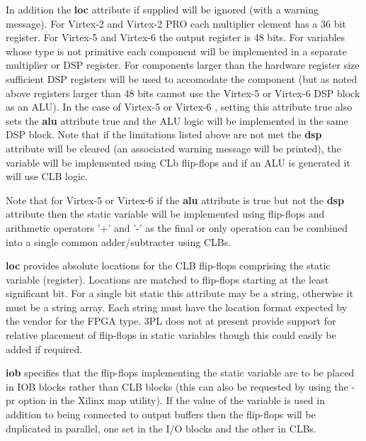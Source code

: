         In addition the {\bf loc} attribute if supplied will be ignored (with a
        warning message). For Virtex-2 and Virtex-2 PRO each multiplier element
        has a 36 bit register. For Virtex-5 and Virtex-6 the output register is
        48 bits. For variables whose type is not primitive each component will
        be implemented in a separate multiplier or DSP register. For components
        larger than the hardware register size sufficient DSP registers will be
        used to accomodate the component (but as noted above registers larger
        than 48 bits cannot use the Virtex-5 or Virtex-6 DSP block as an ALU).
        In the case of Virtex-5 or Virtex-6 , setting this attribute true also
        sets the {\bf alu} attribute true and the ALU logic will be implemented in the
        same DSP block. Note that if the limitations listed above are not met
        the {\bf dsp} attribute will be cleared (an associated warning message will be
        printed), the variable will be implemented using CLb flip-flops and if
        an ALU is generated it will use CLB logic.
        
        Note that for Virtex-5 or Virtex-6 if the {\bf alu} attribute is true but not
        the {\bf dsp} attribute then the static variable will be implemented using
        flip-flops and arithmetic operators '+' and '-' as the final or only
        operation can be combined into a single common adder/subtracter using
        CLBs.
        
        {\bf loc} provides absolute locations for the CLB flip-flops comprising
        the static variable (register). Locations are matched to flip-flops
        starting at the least significant bit. For a single bit static this
        attribute may be a string, otherwise it must be a string array. Each
        string must have the location format expected by the vendor for the FPGA
        type. 3PL does not at present provide support for relative placement
        of flip-flops in static variables though this could easily be added
        if required.

        {\bf iob} specifies that the flip-flops implementing the static variable
        are to be placed in IOB blocks rather than CLB blocks (this can also be
        requested by using the -pr option in the Xilinx map utility). If the
        value of the variable is used in addition to being connected to
        output buffers then the flip-flops will be duplicated in parallel, one
        set in the I/O blocks and the other in CLBs.
        
